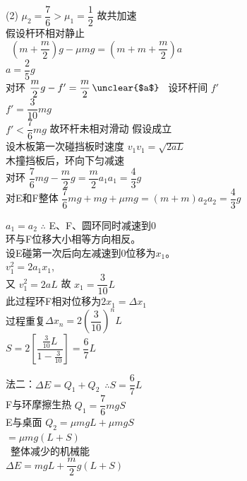 \begin{problem}
\begin{solution}
(2) $\mu_2=\dfrac76>\mu_1=\dfrac12$ 故共加速\\
\hspace*{3em}假设杆环相对静止\\
\hspace*{1em}\ $\left(m+\dfrac m2\right)g-\mu mg=\left(m+m+\dfrac m2\right)a$\\
\hspace*{6em}$a=\dfrac25 g$\\
\hspace*{3em}对环 $\dfrac m2 g-f'=\dfrac m2\,\text{\unclear{$a$}}$ %
\ 设环杆间 $f'$\\
\hspace*{6em}$f'=\dfrac{3}{10}mg$\\
\hspace*{6em}$f'<\dfrac76 mg$ 故环杆未相对滑动 假设成立\\
设木板第一次碰挡板时速度 $v_1$\quad $v_1=\sqrt{2aL}$\\
木撞挡板后，环向下匀减速\\
\hspace*{3em}对环 $\dfrac76 mg-\dfrac m2 g=\dfrac m2 a_1$\quad $a_1=\dfrac43 g$\\
\hspace*{1em}对E和F整体 $\dfrac76 mg+mg+\mu mg=(m+m)a_2$\quad $a_2=\dfrac43 g$

$a_1=a_2$ $\therefore$ E、F、圆环同时减速到0\\
环与F位移大小相等方向相反。\\
设E碰第一次后向左减速到0位移为$x_1$。\\
\hspace*{3em}$v_1^2=2a_1x_1$,\\
\hspace*{1em}又 $v_1^2=2aL$ 故 $x_1=\dfrac{3}{10}L$\\
此过程环F相对位移为$2x_1=\Delta x_1$\\
\hspace*{1em}过程重复\quad $\Delta x_n=2\left(\dfrac{3}{10}\right)^nL$\\
\hspace*{3em}$S=2\left[\dfrac{\frac{3}{10}L}{1-\frac{3}{10}}\right]=\dfrac67 L$

法二：\quad $\Delta E=Q_1+Q_2$\ $\therefore S=\dfrac67 L$\\
\hspace*{1em}F与环摩擦生热 $Q_1=\dfrac76 mgS$\\
\hspace*{1em}E与桌面 $Q_2=\mu mgL+\mu mgS$\\
\hspace*{6em}$=\mu mg(L+S)$\\
\ 整体减少的机械能\\
\hspace*{3em}$\Delta E=mgL+\dfrac m2 g(L+S)$
\end{solution}
\end{problem}
